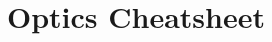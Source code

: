\documentclass[UTF8,8pt]{ctexart}
\title{Optics Cheatsheet}
\makeatletter
\renewcommand{\section}{\@startsection{section}{1}{0mm}%
    {-1ex plus -.5ex minus -.2ex}%
    {0.5ex plus .2ex}%
{\normalfont\large\bfseries}}
\makeatother
\begin{document}
 
\leftmargini=5mm
\raggedright
\footnotesize
\begin{multicols}{3}

\end{multicols}
\end{document}
